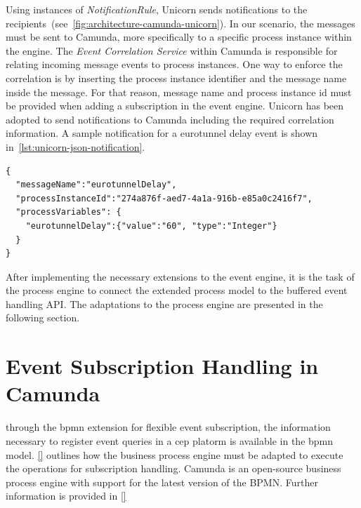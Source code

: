 Using instances of \textit{NotificationRule}, Unicorn sends notifications to the recipients~(see~\autoref{fig:architecture-camunda-unicorn}). In our scenario, the messages must be sent to Camunda, more specifically to a specific process instance within the engine.
The \textit{Event Correlation Service} within Camunda is responsible for relating incoming message events to process instances. One way to enforce the correlation is by inserting the process instance identifier and the message name inside the message.
For that reason, message name and process instance id must be provided when adding a subscription in the event engine. 
Unicorn has been adopted to send notifications to Camunda including the required correlation information. A sample notification for a eurotunnel delay event is shown in~\autoref{lst:unicorn-json-notification}.

\begin{lstlisting}[caption={Example of a JSON notification sent by UNICORN},label=lst:unicorn-json-notification]
{
  "messageName":"eurotunnelDelay",
  "processInstanceId":"274a876f-aed7-4a1a-916b-e85a0c2416f7",
  "processVariables": { 
    "eurotunnelDelay":{"value":"60", "type":"Integer"}
  }
}
\end{lstlisting}


After implementing the necessary extensions to the event engine, it is the task of the process engine to connect the extended process model to the buffered event handling API.
The adaptations to the process engine are presented in the following section.

\section{Event Subscription Handling in Camunda}\label{ch:implcamunda}
through the bpmn extension for flexible event subscription, the information necessary to register event queries in a cep platorm is available in the bpmn model.
\autoref{} outlines how the business process engine must be adapted to execute the operations for subscription handling.
Camunda is an open-source business process engine with support for the latest version of the BPMN. Further information is provided in \autoref{}

